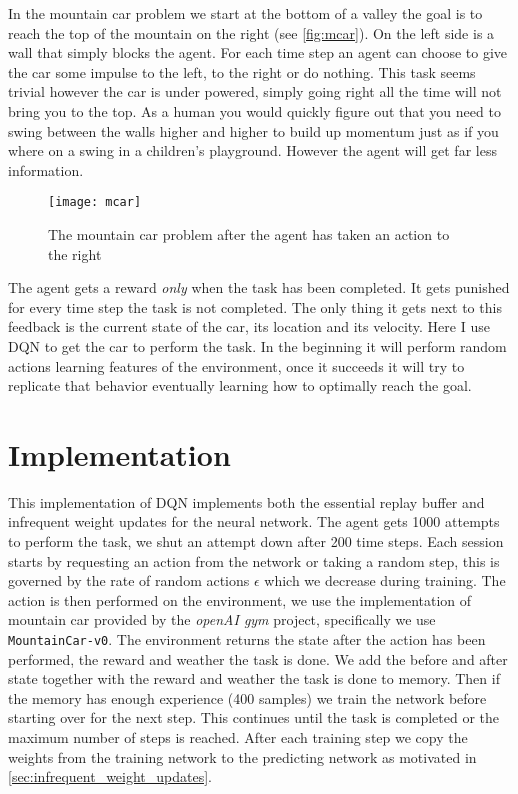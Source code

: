 \label{sec:mountain_car}
In the mountain car problem we start at the bottom of a valley the goal is to reach the top of the mountain on the right (see \autoref{fig:mcar}). On the left side is a wall that simply blocks the agent. For each time step an agent can choose to give the car some impulse to the left, to the right or do nothing. This task seems trivial however the car is under powered, simply going right all the time will not bring you to the top. As a human you would quickly figure out that you need to swing between the walls higher and higher to build up momentum just as if you where on a swing in a children's playground. However the agent will get far less information. 

\begin{figure}
    \texttt{[image: mcar]}
    \caption{The mountain car problem after the agent has taken an action to the right}
    \label{fig:mcar}
\end{figure}

The agent gets a reward \textit{only} when the task has been completed. It gets punished for every time step the task is not completed. The only thing it gets next to this feedback is the current state of the car, its location and its velocity. Here I use DQN to get the car to perform the task. In the beginning it will perform random actions learning features of the environment, once it succeeds it will try to replicate that behavior eventually learning how to optimally reach the goal.

\section{Implementation}
\label{sec:mcar_impl}
This implementation of DQN implements both the essential replay buffer and infrequent weight updates for the neural network. The agent gets 1000 attempts to perform the task, we shut an attempt down after 200 time steps. Each session starts by requesting an action from the network or taking a random step, this is governed by the rate of random actions $\epsilon$ which we decrease during training. The action is then performed on the environment, we use the implementation of mountain car provided by the \textit{openAI gym} project, specifically we use \texttt{MountainCar-v0}. The environment returns the state after the action has been performed, the reward and weather the task is done. We add the before and after state together with the reward and weather the task is done to memory. Then if the memory has enough experience (400 samples) we train the network before starting over for the next step. This continues until the task is completed or the maximum number of steps is reached. After each training step we copy the weights from the training network to the predicting network as motivated in \autoref{sec:infrequent_weight_updates}. 

